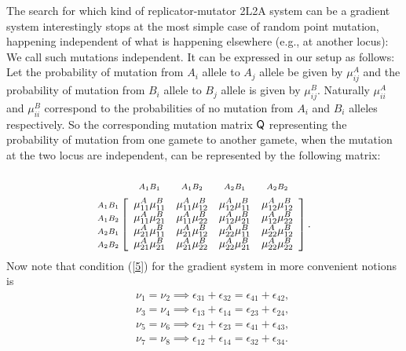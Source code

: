 \documentclass[
 pre,
 aps,
 a4paper,
 english,
 showkeys,
 reprint,
 twocolumn,
 superscriptaddress
]{revtex4}
\newcommand{\indsize}{\scriptsize}
\newcommand{\colind}[2]{\displaystyle\smash{\mathop{#1}^{\raisebox{.5\normalbaselineskip}{\indsize #2}}}}
\newcommand{\rowind}[1]{\mbox{\indsize #1}}
\begin{document}
The search for which kind of replicator-mutator 2L2A system can be a gradient system interestingly stops at the most simple case of random point mutation, happening independent of what is happening elsewhere (e.g., at another locus): We call such mutations independent. It can be expressed in our setup as follows: Let the probability of mutation from $A_i$ allele to $A_j$ allele be given by $\mu_{ij}^A$ and the probability of mutation from $B_i$ allele to $B_j$ allele is given by $\mu_{ij}^B$. Naturally $\mu_{ii}^A$ and $\mu_{ii}^B$ correspond to the probabilities of no mutation from $A_i$ and $B_i$ alleles respectively. So the corresponding mutation matrix ${\sf Q}$ representing the probability of mutation from one gamete to another gamete, when the mutation at the two locus are independent, can be represented by the following matrix:
\[
\begin{array}{@{}c@{}}\label{matrix_1}
\rowind{$A_1B_1$} \\ \rowind{$A_1B_2$} \\ \rowind{$A_2B_1$} \\ \rowind{$A_2B_2$} 
\end{array}
\mathop{\left[
	\begin{array}{ *{5}{c} }
	\colind{\mu_{11}^A \mu_{11}^B}{$A_1B_1$}  &  \colind{\mu_{11}^A \mu_{12}^B}{$A_1B_2$}  &  \colind{\mu_{12}^A \mu_{11}^B}{$A_2B_1$}  & \colind{\mu_{12}^A \mu_{12}^B}{$A_2B_2$}  \\
	\mu_{11}^A \mu_{21}^B &  \mu_{11}^A \mu_{22}^B  &  \mu_{12}^A \mu_{21}^B  & \mu_{12}^A \mu_{22}^B \\
	\mu_{21}^A \mu_{11}^B  & \mu_{21}^A \mu_{12}^B &  \mu_{22}^A \mu_{11}^B  & \mu_{22}^A \mu_{12}^B \\
	\mu_{21}^A \mu_{21}^B  &  \mu_{21}^A \mu_{22}^B  & \mu_{22}^A \mu_{21}^B & \mu_{22}^A \mu_{22}^B
	\end{array}
	\right]}^{
	\begin{array}{@{}c@{}}
	 \\ \mathstrut
	\end{array}
}.
\]
Now note that condition (\ref{5}) for the gradient system in more convenient notions is
\begin{subequations}\label{5'}
	\begin{eqnarray}
	&& \nu_1=\nu_2 \implies \epsilon_{31}+\epsilon_{32}=\epsilon_{41}+\epsilon_{42},\\  
	&& \nu_3=\nu_4 \implies \epsilon_{13}+\epsilon_{14}=\epsilon_{23}+\epsilon_{24},\\
	 && \nu_5=\nu_6 \implies \epsilon_{21}+\epsilon_{23}=\epsilon_{41}+\epsilon_{43},\\ 
	 && \nu_7=\nu_8 \implies \epsilon_{12}+\epsilon_{14}=\epsilon_{32}+\epsilon_{34}.
	\end{eqnarray}
\end{subequations}
\end{document}
